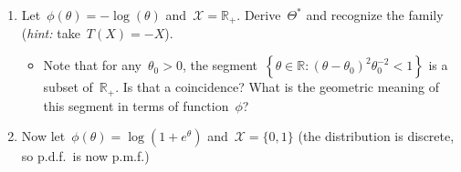 \documentclass[11pt]{article}
\newcommand{\odima}[1]{{\color{red} #1}}
\newcommand{\R}{\mathds{R}}
\newcommand{\E}{\mathds{E}}
\newcommand{\Var}{\textup{Var}}
\newcommand{\cX}{\mathcal{X}}
\newcommand{\leqs}{\leqslant}
\renewcommand{\le}{\leqs}
\begin{document}
\begin{enumerate}
\item Let~$\phi(\theta) = -\log(\theta)$ and~$\mathcal{X} = \R_+$. Derive~$\Theta^*$ and recognize the family ({\em hint:} take~$T(X) = -X$).
\begin{itemize}
\item Note that for any~$\theta_0 > 0$, the segment~$\left\{ \theta \in \R: {(\theta - \theta_0)^2}{\theta_0^{-2}} < 1 \right\}$ is a subset of~$\R_+$. Is that a coincidence? What is the geometric meaning of this segment in terms of function~$\phi$?
\end{itemize}
\item Now let~$\phi(\theta) = \log(1 + e^{\theta})$ and~$\cX = \{0,1\}$ (the distribution is discrete, so p.d.f.~is now p.m.f.) 


\end{enumerate}
\end{document}
